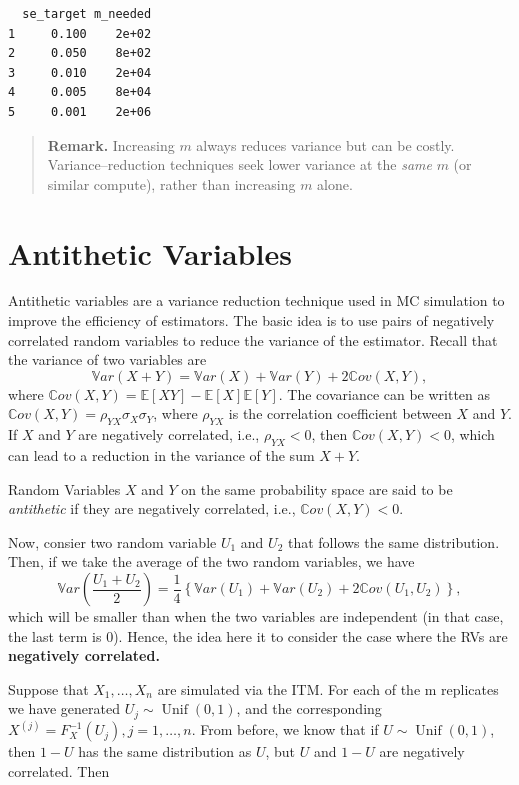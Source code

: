 \documentclass[
  letterpaper,
  DIV=11,
  numbers=noendperiod]{scrreprt}
\begin{document}
\begin{verbatim}
  se_target m_needed
1     0.100    2e+02
2     0.050    8e+02
3     0.010    2e+04
4     0.005    8e+04
5     0.001    2e+06
\end{verbatim}

\begin{quote}
\textbf{Remark.} Increasing \(m\) always reduces variance but can be
costly. Variance--reduction techniques seek lower variance at the
\emph{same} \(m\) (or similar compute), rather than increasing \(m\)
alone.
\end{quote}

\section{Antithetic Variables}\label{antithetic-variables}

Antithetic variables are a variance reduction technique used in MC
simulation to improve the efficiency of estimators. The basic idea is to
use pairs of negatively correlated random variables to reduce the
variance of the estimator. Recall that the variance of two variables are
\[
\mathbb{V}ar(X+Y) = \mathbb{V}ar(X) + \mathbb{V}ar(Y) + 2\mathbb{C}ov(X,Y),
\] where
\(\mathbb{C}ov(X,Y) =\mathbb{E}[XY] - \mathbb{E}[X] \mathbb{E}[Y]\). The
covariance can be written as
\(\mathbb{C}ov(X,Y) = \rho_{YX} \sigma_X \sigma_Y\), where \(\rho_{YX}\)
is the correlation coefficient between \(X\) and \(Y\). If \(X\) and
\(Y\) are negatively correlated, i.e., \(\rho_{YX} < 0\), then
\(\mathbb{C}ov(X,Y) < 0\), which can lead to a reduction in the variance
of the sum \(X + Y\).

Random Variables \(X\) and \(Y\) on the same probability space are said
to be \emph{antithetic} if they are negatively correlated, i.e.,
\(\mathbb{C}ov(X,Y) < 0\).

Now, consier two random variable \(U_1\) and \(U_2\) that follows the
same distribution. Then, if we take the average of the two random
variables, we have \[
\mathbb{V}ar\left(\frac{U_1 + U_2}{2}\right) = \frac{1}{4} \left\{\mathbb{V}ar(U_1) + \mathbb{V}ar(U_2) + 2\mathbb{C}ov(U_1,U_2)\right\},
\] which will be smaller than when the two variables are independent (in
that case, the last term is 0). Hence, the idea here it to consider the
case where the RVs are \textbf{negatively correlated.}

Suppose that \(X_1, \dots , X_n\) are simulated via the ITM. For each of
the m replicates we have generated \(U_j \sim\operatorname{Unif}(0,1)\),
and the corresponding \(X^{(j)} = F^{−1}_X(U_j), j = 1, \dots, n\). From
before, we know that if \(U\sim\operatorname{Unif}(0,1)\), then
\(1 − U\) has the same distribution as \(U\), but \(U\) and \(1 − U\)
are negatively correlated. Then
\end{document}
